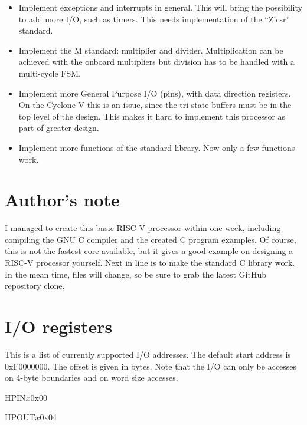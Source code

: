 \documentclass[12pt]{article}
\begin{document}
\begin{itemize}
\item Implement exceptions and interrupts in general. This will bring the possibility to add more I/O, such as timers. This needs implementation of the ``Zicsr'' standard.
\item Implement the M standard: multiplier and divider. Multiplication can be achieved with the onboard multipliers but division has to be handled with a multi-cycle FSM.
\item Implement more General Purpose I/O (pins), with data direction registers. On the Cyclone V this is an issue, since the tri-state buffers must be in the top level of the design. This makes it hard to implement this processor as part of greater design.
\item Implement more functions of the standard library. Now only a few functions work.
\end{itemize}

\section{Author's note}
I managed to create this basic RISC-V processor within one week, including compiling the GNU C compiler and the created C program examples. Of course, this is not the fastest core available, but it gives a good example on designing a RISC-V processor yourself. Next in line is to make the standard C library work. In the mean time, files will change, so be sure to grab the latest GitHub repository clone.

\appendix
\section{I/O registers}

This is a list of currently supported I/O addresses. 
The default start address is 0xF0000000. The offset is given in bytes. Note that the I/O can only be accesses on 4-byte boundaries and on word size accesses.

\begin{register}{H}{PIN$x$}{0x00}%
\label{pinx}%
\regnewline%
\end{register}

\begin{register}{H}{POUT$x$}{0x04}%
\label{poutx}%
\regnewline%
\end{register}
\end{document}
